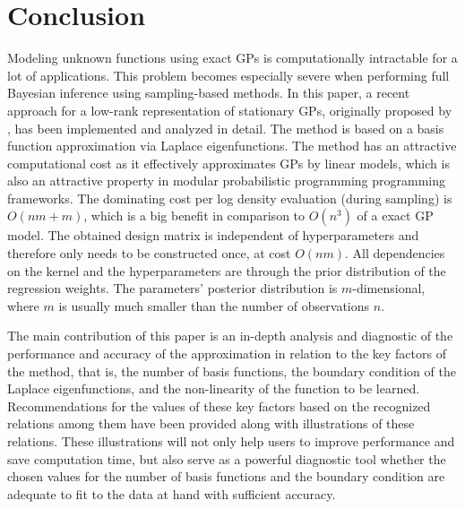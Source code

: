 \section{Conclusion}\label{sec_conclusion}

Modeling unknown functions using exact GPs is computationally intractable for a lot of applications. This problem becomes especially severe when performing full Bayesian inference using sampling-based methods. In this paper, a recent approach for a low-rank representation of stationary GPs, originally proposed by \citet{solin2018hilbert}, has been implemented and analyzed in detail. The method is based on a basis function approximation via Laplace eigenfunctions. The method has an attractive computational cost as it effectively approximates GPs by linear models, which is also an attractive property in modular probabilistic programming programming frameworks. The dominating cost per log density evaluation (during sampling) is $O(nm+m)$, which is a big benefit in comparison to $O(n^3)$ of a exact GP model. The obtained design matrix is independent of hyperparameters and therefore only needs to be constructed once, at cost $O(nm)$. All dependencies on the kernel and the hyperparameters are through the prior distribution of the regression weights. The parameters' posterior distribution is $m$-dimensional, where $m$ is usually much smaller than the number of observations $n$. 

The main contribution of this paper is an in-depth analysis and diagnostic of the performance and accuracy of the approximation in relation to the key factors of the method, that is, the number of basis functions, the boundary condition of the Laplace eigenfunctions, and the non-linearity of the function to be learned. Recommendations for the values of these key factors based on the recognized relations among them have been provided along with illustrations of these relations. These illustrations will not only help users to improve performance and save computation time, but also serve as a powerful diagnostic tool whether the chosen values for the number of basis functions and the boundary condition are adequate to fit to the data at hand with sufficient accuracy.

